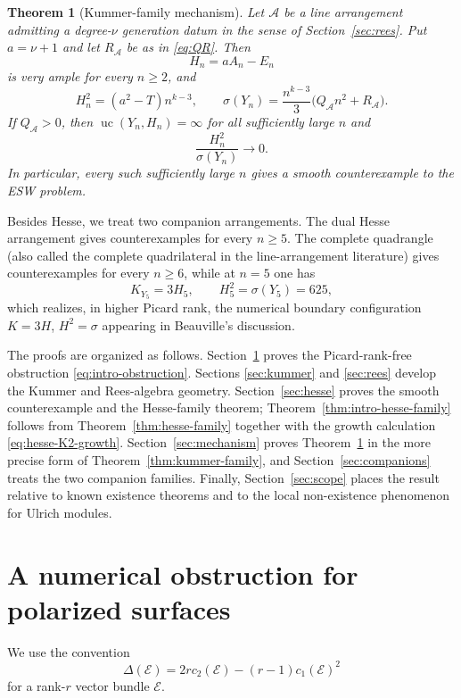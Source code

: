 \documentclass[11pt]{article}
\newtheorem{theorem}{Theorem}[section]
\newcommand{\cE}{\mathcal E}
\newcommand{\cA}{\mathcal A}
\newcommand{\sig}{\sigma}
\newcommand{\uc}{\operatorname{uc}}
\begin{document}
\begin{theorem}[Kummer-family mechanism]\label{thm:intro-mechanism}
Let $\cA$ be a line arrangement admitting a degree-$\nu$ generation datum in the
sense of Section~\ref{sec:rees}.  Put $a=\nu+1$ and let $R_{\cA}$ be as in
\eqref{eq:QR}.  Then
\[
        H_n=aA_n-E_n
\]
is very ample for every $n\ge2$, and
\[
        H_n^2=(a^2-T)n^{k-3},
        \qquad
        \sig(Y_n)=\frac{n^{k-3}}3
        \bigl(Q_{\cA}n^2+R_{\cA}\bigr).
\]
If $Q_{\cA}>0$, then $\uc(Y_n,H_n)=\infty$ for all sufficiently large $n$ and
\[
        \frac{H_n^2}{\sig(Y_n)}\longrightarrow0.
\]
In particular, every such sufficiently large $n$ gives a smooth counterexample to
the ESW problem.
\end{theorem}

Besides Hesse, we treat two companion arrangements.  The dual Hesse arrangement
gives counterexamples for every $n\ge5$.  The complete quadrangle (also called the complete quadrilateral in the
line-arrangement literature) gives counterexamples for every $n\ge6$, while at $n=5$ one has
\[
        K_{Y_5}=3H_5,
        \qquad
        H_5^2=\sig(Y_5)=625,
\]
which realizes, in higher Picard rank, the numerical boundary configuration
$K=3H$, $H^2=\sig$ appearing in Beauville's discussion.

The proofs are organized as follows.  Section~\ref{sec:ulrich} proves the
Picard-rank-free obstruction \eqref{eq:intro-obstruction}.  Sections
\ref{sec:kummer} and \ref{sec:rees} develop the Kummer and Rees-algebra geometry.
Section~\ref{sec:hesse} proves the smooth counterexample and the Hesse-family theorem;
Theorem~\ref{thm:intro-hesse-family} follows from Theorem~\ref{thm:hesse-family}
together with the growth calculation \eqref{eq:hesse-K2-growth}.  Section~\ref{sec:mechanism}
proves Theorem~\ref{thm:intro-mechanism} in the more precise form of
Theorem~\ref{thm:kummer-family}, and Section~\ref{sec:companions} treats the two
companion families.  Finally, Section~\ref{sec:scope} places the result relative
to known existence theorems and to the local non-existence phenomenon for Ulrich modules.

\section{A numerical obstruction for polarized surfaces}\label{sec:ulrich}

We use the convention
\[
        \Delta(\cE)=2r c_2(\cE)-(r-1)c_1(\cE)^2
\]
for a rank-$r$ vector bundle $\cE$.
\end{document}

